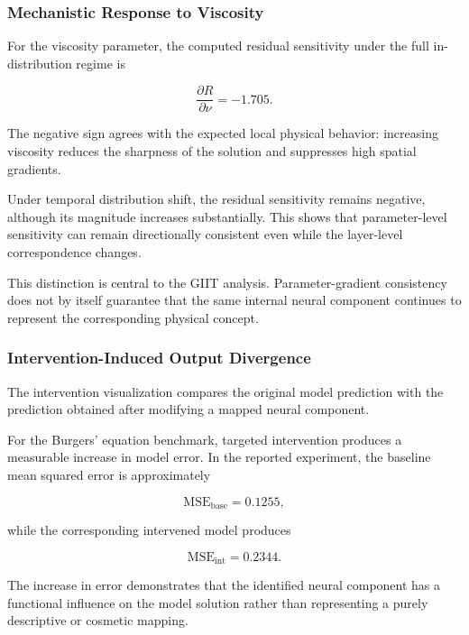 \documentclass[12pt,singleside,a4paper]{article}
\begin{document}
\subsubsection{Mechanistic Response to Viscosity}

For the viscosity parameter, the computed residual sensitivity under
the full in-distribution regime is

\begin{equation}
    \frac{\partial R}{\partial \nu} = -1.705.
\end{equation}

The negative sign agrees with the expected local physical behavior:
increasing viscosity reduces the sharpness of the solution and
suppresses high spatial gradients.

Under temporal distribution shift, the residual sensitivity remains
negative, although its magnitude increases substantially. This shows
that parameter-level sensitivity can remain directionally consistent
even while the layer-level correspondence changes.

This distinction is central to the GIIT analysis. Parameter-gradient
consistency does not by itself guarantee that the same internal neural
component continues to represent the corresponding physical concept.


\subsubsection{Intervention-Induced Output Divergence}

The intervention visualization compares the original model prediction
with the prediction obtained after modifying a mapped neural component.

For the Burgers' equation benchmark, targeted intervention produces a
measurable increase in model error. In the reported experiment, the
baseline mean squared error is approximately

\begin{equation}
    \mathrm{MSE}_{\mathrm{base}} = 0.1255,
\end{equation}

while the corresponding intervened model produces

\begin{equation}
    \mathrm{MSE}_{\mathrm{int}} = 0.2344.
\end{equation}

The increase in error demonstrates that the identified neural
component has a functional influence on the model solution rather
than representing a purely descriptive or cosmetic mapping.
\end{document}
